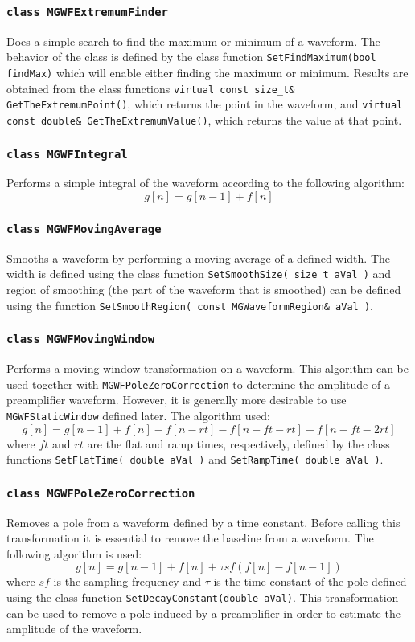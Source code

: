 			
			\subsubsection{\lstinline!class MGWFExtremumFinder!}
Does a simple search to find the maximum or minimum of a waveform.  The behavior of the class is defined by the class function \lstinline!SetFindMaximum(bool findMax)! which will enable either finding the maximum or minimum.  Results are obtained from the class functions \lstinline!virtual const size_t& GetTheExtremumPoint()!, which returns the point in the waveform, and \lstinline!virtual const double& GetTheExtremumValue()!, which returns the value at that point.

			\subsubsection{\lstinline!class MGWFIntegral!}
Performs a simple integral of the waveform according to the following algorithm:
				\[
				g[n] = g[n-1] + f[n]
				\]
			
			\subsubsection{\lstinline!class MGWFMovingAverage!}
Smooths a waveform by performing a moving average of a defined width.  The width is defined using the class function \lstinline!SetSmoothSize( size_t aVal )! and region of smoothing (the part of the waveform that is smoothed) can be defined using the function \lstinline!SetSmoothRegion( const MGWaveformRegion& aVal )!.
			
			\subsubsection{\lstinline!class MGWFMovingWindow!}
Performs a moving window transformation on a waveform.  This algorithm can be used together with \lstinline!MGWFPoleZeroCorrection! to determine the amplitude of a preamplifier waveform.  However, it is generally more desirable to use \lstinline!MGWFStaticWindow! defined later.  The algorithm used:
				\[
				g[n] = g[n-1] + f[n] - f[n-rt] - f[n-ft-rt] + f[n-ft-2rt]
				\]
where $ft$ and $rt$ are the flat and ramp times, respectively, defined by the class functions \lstinline!SetFlatTime( double aVal )! and \lstinline!SetRampTime( double aVal )!.
			
			\subsubsection{\lstinline!class MGWFPoleZeroCorrection!}
Removes a pole from a waveform defined by a time constant.  Before calling this transformation it is essential to remove the baseline from a waveform.  The following algorithm is used:
				\[
				g[n] = g[n-1] + f[n] + \tau sf(f[n] - f[n-1])
				\]
where $sf$ is the sampling frequency and $\tau$ is the time constant of the pole defined using the class function \lstinline!SetDecayConstant(double aVal)!.  This transformation can be used to remove a pole induced by a preamplifier in order to estimate the amplitude of the waveform.
			
